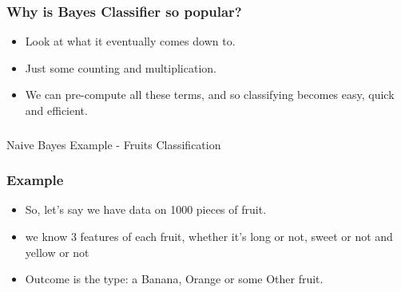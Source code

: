 

\begin{frame}[fragile]\frametitle{Why is Bayes Classifier so popular?}
\begin{itemize}
\item Look at what it eventually comes down to. 
\item Just some counting and multiplication.
\item We can pre-compute all these terms, and so classifying becomes easy, quick and efficient. 
\end{itemize}
\end{frame}


\begin{frame}[fragile]\frametitle{}
\begin{center}
{\Large Naive Bayes Example - Fruits Classification}
\end{center}
\end{frame}

\begin{frame}[fragile]\frametitle{Example}
\begin{itemize}
\item So, let's say we have data on 1000 pieces of fruit. 
\item we know 3 features of each fruit, whether it's long or not, sweet or not and yellow or not
\item Outcome is the type: a Banana, Orange or some Other fruit.
\end{itemize}
\end{frame}


